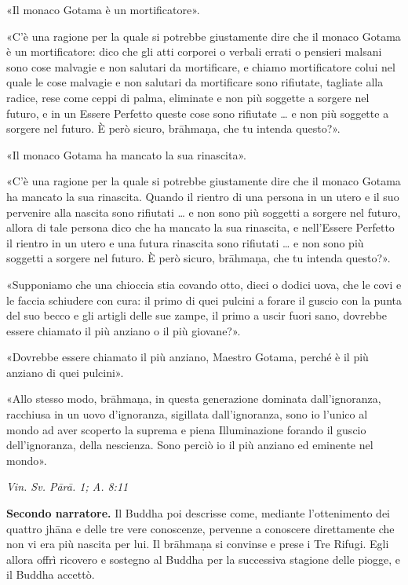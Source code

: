 «Il monaco Gotama è un mortificatore».


«C’è una ragione per la quale si potrebbe giustamente dire che il monaco
Gotama è un mortificatore: dico che gli atti corporei o verbali errati o
pensieri malsani sono cose malvagie e non salutari da mortificare, e
chiamo mortificatore colui nel quale le cose malvagie e non salutari da
mortificare sono rifiutate, tagliate alla radice, rese come ceppi di
palma, eliminate e non più soggette a sorgere nel futuro, e in un Essere
Perfetto queste cose sono rifiutate … e non più soggette a sorgere nel
futuro. È però sicuro, brāhmaṇa, che tu intenda questo?».


«Il monaco Gotama ha mancato la sua rinascita».


«C’è una ragione per la quale si potrebbe giustamente dire che il monaco
Gotama ha mancato la sua rinascita. Quando il rientro di una persona in
un utero e il suo pervenire alla nascita sono rifiutati … e non sono più
soggetti a sorgere nel futuro, allora di tale persona dico che ha
mancato la sua rinascita, e nell’Essere Perfetto il rientro in un utero
e una futura rinascita sono rifiutati … e non sono più soggetti a
sorgere nel futuro. È però sicuro, brāhmaṇa, che tu intenda questo?».


«Supponiamo che una chioccia stia covando otto, dieci o dodici uova, che
le covi e le faccia schiudere con cura: il primo di quei pulcini a
forare il guscio con la punta del suo becco e gli artigli delle sue
zampe, il primo a uscir fuori sano, dovrebbe essere chiamato il più
anziano o il più giovane?».


«Dovrebbe essere chiamato il più anziano, Maestro Gotama, perché è il
più anziano di quei pulcini».


«Allo stesso modo, brāhmaṇa, in questa generazione dominata
dall’ignoranza, racchiusa in un uovo d’ignoranza, sigillata
dall’ignoranza, sono io l’unico al mondo ad aver scoperto la suprema e
piena Illuminazione forando il guscio dell’ignoranza, della nescienza.
Sono perciò io il più anziano ed eminente nel mondo».


\emph{Vin. Sv. Pārā. 1; A. 8:11}


\textbf{Secondo narratore.} Il Buddha poi descrisse come, mediante l’ottenimento
dei quattro jhāna e delle tre vere conoscenze, pervenne a conoscere
direttamente che non vi era più nascita per lui. Il brāhmaṇa si convinse
e prese i Tre Rifugi. Egli allora offrì ricovero e sostegno al Buddha
per la successiva stagione delle piogge, e il Buddha accettò.


